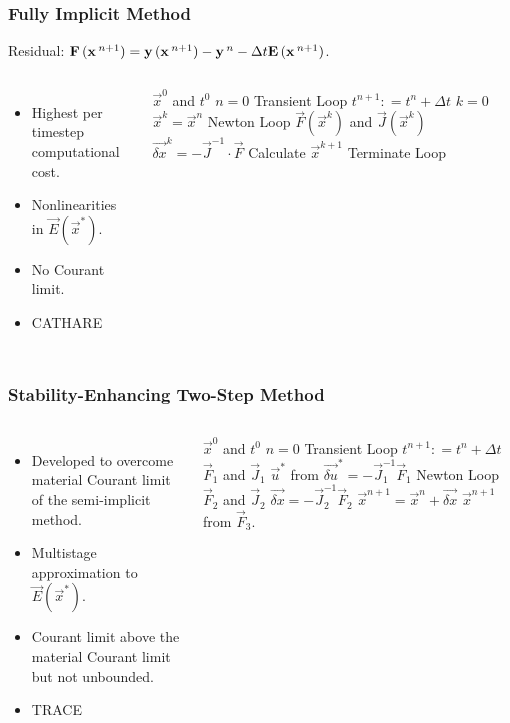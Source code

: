 \documentclass[compress,xcolor=table]{beamer}
\begin{document}
\begin{frame} 
\frametitle{Fully Implicit Method}

Residual: $\vec{F}(\vec{x}^{n+1}) = \vec{y}(\vec{x}^{n+1}) - \vec{y}^{n} - \dt{} \vec{E}(\vec{x}^{n+1})$.

\begin{columns}

\begin{itemize}
\item{Highest per timestep computational cost.}
\item{Nonlinearities in $\vec{E}(\vec{x}^{*})$.}
\item{No Courant limit.}
\item{CATHARE}
\end{itemize}


\begin{algorithmic}
\scriptsize
\Require $\vec{x}^{0}$ and $t^{0}$
\Set $n = 0$
\Loop \; Transient Loop
    \Set $t^{n+1} : = t^{n} + \Delta t$
    \Set $k = 0$
    \Set $\vec{x}^{k} = \vec{x}^{n}$
    \Loop \; Newton Loop
		\Calculate $\vec{F}(\vec{x}^{k})$ and $\vec{J}(\vec{x}^{k})$
		\Calculate $\vec{\delta x}^k = - \vec{J}^{-1}\cdot\vec{F}$
		\BlackBox Calculate $\vec{x}^{k+1}$
		\BlackBox Terminate Loop
\end{algorithmic}

\end{columns}
\end{frame}
\begin{frame} 
\frametitle{Stability-Enhancing Two-Step Method}

\begin{columns}

\begin{itemize}
\item{Developed to overcome material Courant limit of the semi-implicit method.}
\item{Multistage approximation to $\vec{E}(\vec{x}^{*})$.}
\item{Courant limit above the material Courant limit but not unbounded.}
\item{TRACE}
\end{itemize}

\begin{algorithmic}
\scriptsize
\Require $\vec{x}^{0}$ and $t^{0}$
\Set $n = 0$
\Loop \; Transient Loop
    \State $t^{n+1} : = t^{n} + \Delta t$
	\Calculate $\vec{F}_1$ and $\vec{J}_1$
	\Calculate $\vec{u}^{*}$ from $\vec{\delta u}^{*} = -\vec{J}^{-1}_1\vec{F}_1$
	\Loop \; Newton Loop
		\Calculate $\vec{F}_2$ and $\vec{J}_2$
		\Calculate $\vec{\delta x} = - \vec{J}_2^{-1}\vec{F}_2$
		\Calculate $\vec{x}^{n+1} = \vec{x}^{n} + \vec{\delta x}$
	\EndLoop
	\Calculate $\vec{x}^{n+1}$ from $\vec{F}_3$.
\end{algorithmic}

\end{columns}
\end{frame}
\end{document}

